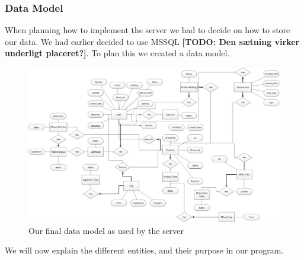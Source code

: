 \subsubsection{Data Model}
When planning how to implement the server we had to decide on how to store our data. We had earlier decided to use MSSQL \textbf{[TODO: Den sætning virker underligt placeret?]}. To plan this we created a data model.
\begin{figure}[t]
  \includegraphics[width=\textwidth]{illustrations/Datamodel.png}
  \caption{Our final data model as used by the server}
  \label{fig:datamodel}
\end{figure}
We will now explain the different entities, and their purpose in our program.

